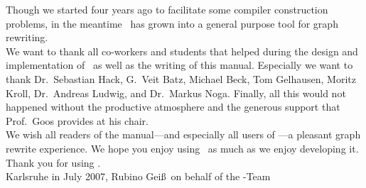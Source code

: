 Though we started four years ago to facilitate some compiler construction problems, in the meantime \GrG\ has grown into a general purpose tool for graph rewriting.\\[3ex]

We want to thank all co-workers and students that helped during the design and implementation of \GrG\ as well as the writing of this manual.
Especially we want to thank Dr.~Sebastian Hack, G.~Veit Batz, Michael Beck, Tom Gelhausen, Moritz Kroll, Dr.~Andreas Ludwig, and Dr.~Markus Noga.
Finally, all this would not happened without the productive atmosphere and the generous support that Prof.~Goos provides at his chair.\\[3ex]

We wish all readers of the manual---and especially all users of \GrG---a pleasant graph rewrite experience.
We hope you enjoy using \GrG\ as much as we enjoy developing it.\\[3ex]

Thank you for using \GrG.\\[6ex]

\noindent Karlsruhe in July 2007, Rubino Gei\ss~on behalf of the \GrG-Team


